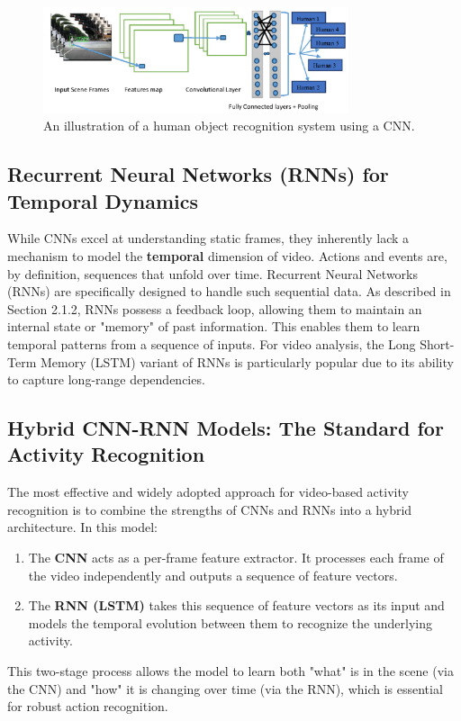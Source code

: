 \begin{figure}[H]
    \centering
    \includegraphics[width=0.8\textwidth]{archivos/figuras/CNN.jpg} 
    \caption{An illustration of a human object recognition system using a CNN.}
    \label{fig:cnn_recognition}
\end{figure}

\subsection{Recurrent Neural Networks (RNNs) for Temporal Dynamics}
While CNNs excel at understanding static frames, they inherently lack a mechanism to model the \textbf{temporal} dimension of video. Actions and events are, by definition, sequences that unfold over time. Recurrent Neural Networks (RNNs) are specifically designed to handle such sequential data. As described in Section 2.1.2, RNNs possess a feedback loop, allowing them to maintain an internal state or "memory" of past information. This enables them to learn temporal patterns from a sequence of inputs. For video analysis, the Long Short-Term Memory (LSTM) variant of RNNs is particularly popular due to its ability to capture long-range dependencies.

\subsection{Hybrid CNN-RNN Models: The Standard for Activity Recognition}
The most effective and widely adopted approach for video-based activity recognition is to combine the strengths of CNNs and RNNs into a hybrid architecture. In this model:
\begin{enumerate}
    \item The \textbf{CNN} acts as a per-frame feature extractor. It processes each frame of the video independently and outputs a sequence of feature vectors.
    \item The \textbf{RNN (LSTM)} takes this sequence of feature vectors as its input and models the temporal evolution between them to recognize the underlying activity.
\end{enumerate}
This two-stage process allows the model to learn both "what" is in the scene (via the CNN) and "how" it is changing over time (via the RNN), which is essential for robust action recognition.

